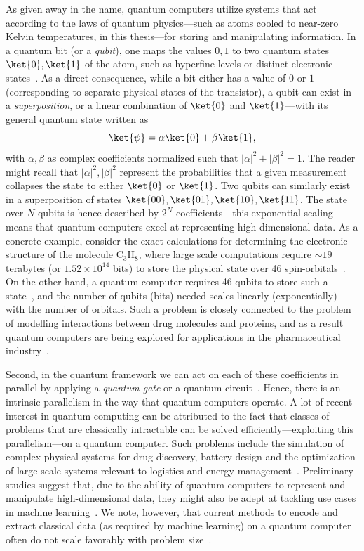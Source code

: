 \documentclass[main.tex]{subfiles}
\begin{document}
As given away in the name, quantum computers utilize systems that act according to the laws of quantum physics---such as atoms cooled to near-zero Kelvin temperatures, in this thesis---for storing and manipulating information. In a quantum bit (or a \emph{qubit}), one maps the values $0, 1$ to two quantum states $\ket{0},\ket{1}$ of the atom, such as hyperfine levels or distinct electronic states~\cite{shannon2021}. As a direct consequence, while a bit either has a value of $0$ or $1$ (corresponding to separate physical states of the transistor), a qubit can exist in a \emph{superposition}, or a linear combination of $\ket{0}$ and $\ket{1}$---with its general quantum state written as 
\begin{equation}
    \ket{\psi} = \alpha\ket{0}+\beta\ket{1},
\end{equation}
with $\alpha,\beta$ as complex coefficients normalized such that $|\alpha|^2+|\beta|^2=1$. The reader might recall that $|\alpha|^2, |\beta|^2$ represent the probabilities that a given measurement collapses the state to either $\ket{0}$ or $\ket{1}$. Two qubits can similarly exist in a superposition of states $\ket{00},\ket{01},\ket{10},\ket{11}$. The state over $N$ qubits is hence described by $2^N$ coefficients---this exponential scaling means that quantum computers excel at representing high-dimensional data. As a concrete example, consider the exact calculations for determining the electronic structure of the molecule $\mathrm{C_3H_8}$, where large scale computations require $\sim 19$ terabytes (or $1.52\times 10^{14}$ bits) to store the physical state over 46 spin-orbitals~\cite{gao2024distributed}. On the other hand, a quantum computer requires 46 qubits to store such a state~\cite{mcardle2020quantum}, and the number of qubits (bits) needed scales linearly (exponentially) with the number of orbitals. Such a problem is closely connected to the problem of modelling interactions between drug molecules and proteins, and as a result quantum computers are being explored for applications in the pharmaceutical industry~\cite{blunt2022perspective}. 

Second, in the quantum framework we can act on each of these coefficients in parallel by applying a \emph{quantum gate} or a quantum circuit~\cite{nielsen2010quantum}. Hence, there is an intrinsic parallelism in the way that quantum computers operate. A lot of recent interest in quantum computing can be attributed to the fact that classes of problems that are classically intractable can be solved efficiently---exploiting this parallelism---on a quantum computer. Such problems include the simulation of complex physical systems for drug discovery, battery design and the optimization of large-scale systems relevant to logistics and energy management~\cite{bayerstadler2021}. Preliminary studies suggest that, due to the ability of quantum computers to represent and manipulate high-dimensional data, they might also be adept at tackling use cases in machine learning~\cite{alchieri2021}. We note, however, that current methods to encode and extract classical data (as required by machine learning) on a quantum computer often do not scale favorably with problem size~\cite{biamonte2017}.
\end{document}
